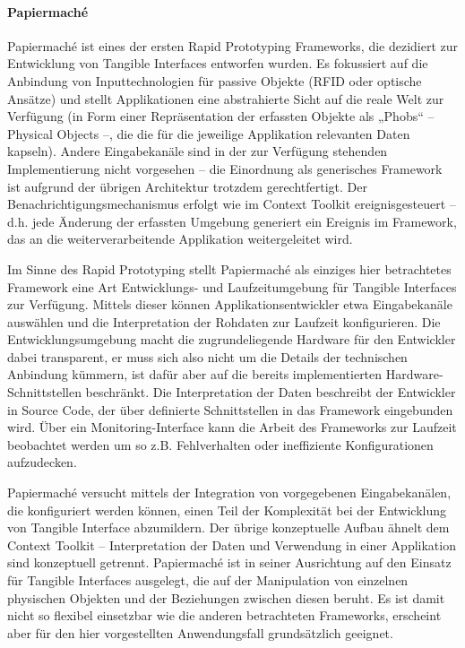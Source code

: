 
\paragraph{Papiermaché} %
\label{par:papiermaché}
Papiermaché \citep{Klemmer04} ist eines der ersten Rapid Prototyping Frameworks, die dezidiert zur Entwicklung von Tangible Interfaces entworfen wurden. Es fokussiert auf die Anbindung von Inputtechnologien für passive Objekte (RFID oder optische Ansätze) und stellt Applikationen eine abstrahierte Sicht auf die reale Welt zur Verfügung (in Form einer Repräsentation der erfassten Objekte als „Phobs“ -- Physical Objects --, die die für die jeweilige Applikation relevanten Daten kapseln). Andere Eingabekanäle sind in der zur Verfügung stehenden Implementierung nicht vorgesehen -- die Einordnung als generisches Framework ist aufgrund der übrigen Architektur trotzdem gerechtfertigt. Der Benachrichtigungsmechanismus erfolgt wie im Context Toolkit ereignisgesteuert -- d.h. jede Änderung der erfassten Umgebung generiert ein Ereignis im Framework, das an die weiterverarbeitende Applikation weitergeleitet wird.

Im Sinne des Rapid Prototyping stellt Papiermaché als einziges hier betrachtetes Framework eine Art Entwicklungs- und Laufzeitumgebung für Tangible Interfaces zur Verfügung. Mittels dieser können Applikationsentwickler etwa Eingabekanäle auswählen und die Interpretation der Rohdaten zur Laufzeit konfigurieren. Die Entwicklungsumgebung macht die zugrundeliegende Hardware für den Entwickler dabei transparent, er muss sich also nicht um die Details der technischen Anbindung kümmern, ist dafür aber auf die bereits implementierten Hardware-Schnittstellen beschränkt. Die Interpretation der Daten beschreibt der Entwickler in Source Code, der über definierte Schnittstellen in das Framework eingebunden wird. Über ein Monitoring-Interface kann die Arbeit des Frameworks zur Laufzeit beobachtet werden um so z.B. Fehlverhalten oder ineffiziente Konfigurationen aufzudecken.

Papiermaché versucht mittels der Integration von vorgegebenen Eingabekanälen, die konfiguriert werden können, einen Teil der Komplexität bei der Entwicklung von Tangible Interface abzumildern. Der übrige konzeptuelle Aufbau ähnelt dem Context Toolkit -- Interpretation der Daten und Verwendung in einer Applikation sind konzeptuell getrennt. Papiermaché ist in seiner Ausrichtung auf den Einsatz für Tangible Interfaces ausgelegt, die auf der Manipulation von einzelnen physischen Objekten und der Beziehungen zwischen diesen beruht. Es ist damit nicht so flexibel einsetzbar wie die anderen betrachteten Frameworks, erscheint aber für den hier vorgestellten Anwendungsfall grundsätzlich geeignet.

